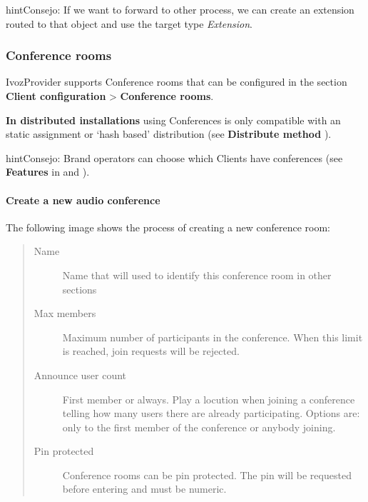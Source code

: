 \documentclass[letterpaper,10pt,spanish]{sphinxmanual}
\begin{document}
\begin{notice}{hint}{Consejo:}
If we want to forward to other process, we can create an extension
routed to that object and use the target type \emph{Extension}.
\end{notice}


\subsubsection{Conference rooms}
\label{administration_portal/client/vpbx/routing_endpoints/conference_rooms::doc}\label{administration_portal/client/vpbx/routing_endpoints/conference_rooms:conference-rooms}\label{administration_portal/client/vpbx/routing_endpoints/conference_rooms:id1}
IvozProvider supports Conference rooms that can be configured in the section
\textbf{Client configuration} \textgreater{} \textbf{Conference rooms}.

\textbf{In distributed installations} using Conferences is only compatible with an static
assignment or `hash based' distribution (see \textbf{Distribute method} {\hyperref[administration_portal/brand/clients/virtual_pbx:virtual\string-pbx]{}}).

\begin{notice}{hint}{Consejo:}
Brand operators can choose which Clients have conferences (see \textbf{Features}
in {\hyperref[getting_started/internal_calls/brand_portal:brand\string-configuration]{}} and {\hyperref[getting_started/internal_calls/client_portal:client\string-configuration]{}}).
\end{notice}
\paragraph{Create a new audio conference}

The following image shows the process of creating a new conference room:
\begin{quote}
\begin{description}
\item[{Name}] \leavevmode
Name that will used to identify this conference room in other sections

\item[{Max members}] \leavevmode
Maximum number of participants in the conference. When this limit is
reached, join requests will be rejected.

\item[{Announce user count}] \leavevmode
First member or always.
Play a locution when joining a conference telling how many users there
are already participating. Options are: only to the first member of the
conference or anybody joining.

\item[{Pin protected}] \leavevmode
Conference rooms can be pin protected. The pin will be requested before
entering and must be numeric.

\end{description}
\end{quote}
\end{document}
